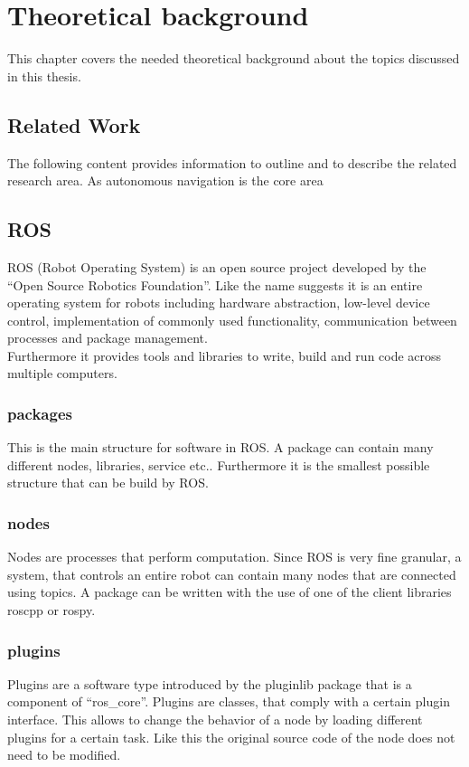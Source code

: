\chapter{Theoretical background}
\label{theoretical_background}
This chapter covers the needed theoretical background about the topics discussed in this thesis.
\section{Related Work}
The following content provides information to outline and to describe the related research area. As autonomous navigation is the core area 


\section{ROS}
ROS (Robot Operating System) is an open source project developed by the ``Open Source Robotics Foundation''. Like the name suggests it is an entire operating system for robots including hardware abstraction, low-level device control, implementation of commonly used functionality, communication between processes and package management.\\
Furthermore it provides tools and libraries to write, build and run code across multiple computers\cite{rosintro}.\\

\subsection{packages}
This is the main structure for software in ROS. A package can contain many different nodes, libraries, service etc.. Furthermore it is the smallest possible structure that can be build by ROS\cite{rosconcepts}.
\subsection{nodes}
Nodes are processes that perform computation. Since ROS is very fine granular, a system, that controls an entire robot can contain many nodes that are connected using topics. A package can be written with the use of one of the client libraries roscpp or rospy\cite{rosconcepts}.
\subsection{plugins}

Plugins are a software type introduced by the pluginlib package that is a component of ``ros\_core''. Plugins are classes, that comply with a certain plugin interface. This allows to change the behavior of a node by loading different plugins for a certain task. Like this the original source code of the node does not need to be modified\cite{pluginlib}.

